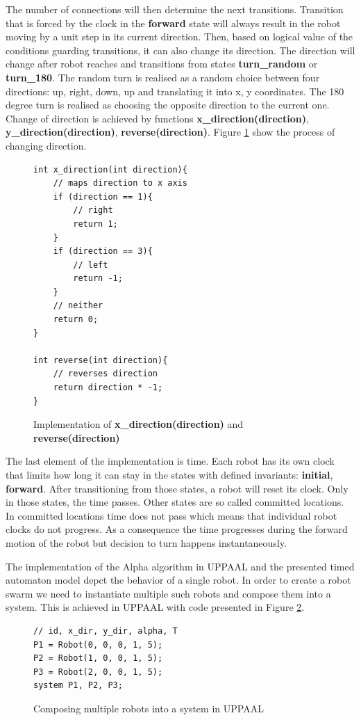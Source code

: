 The number of connections will then determine the next transitions. Transition that is forced by the clock in the \textbf{forward} state will always result in the robot moving by a unit step in its current direction. Then, based on logical value of the conditions guarding transitions, it can also change its direction. The direction will change after robot reaches and transitions from states \textbf{turn\_random} or \textbf{turn\_180}. The random turn is realised as a random choice between four directions: up, right, down, up and translating it into x, y coordinates. The 180 degree turn is realised as choosing the opposite direction to the current one. Change of direction is achieved by functions \textbf{x\_direction(direction)}, \textbf{y\_direction(direction)}, \textbf{reverse(direction)}. Figure \ref{fig:direction} show the process of changing direction.
\begin{figure}[H]
\caption{Implementation of \textbf{x\_direction(direction)} and \textbf{reverse(direction)}}
\lstset { language=C++ }
\begin{lstlisting}
int x_direction(int direction){
    // maps direction to x axis
    if (direction == 1){
        // right
        return 1;
    }
    if (direction == 3){
        // left
        return -1;
    }
    // neither
    return 0;
}

int reverse(int direction){
    // reverses direction
    return direction * -1;
}
\end{lstlisting}
\label{fig:direction}
\end{figure}

The last element of the implementation is time. Each robot has its own clock that limits how long it can stay in the states with defined invariants: \textbf{initial}, \textbf{forward}. After transitioning from those states, a robot will reset its clock. Only in those states, the time passes. Other states are so called committed locations. In committed locations time does not pass which means that individual robot clocks do not progress. As a consequence the time progresses during the forward motion of the robot but decision to turn happens instantaneously.

The implementation of the Alpha algorithm in UPPAAL and the presented timed automaton model depct the behavior of a single robot. In order to create a robot swarm we need to instantiate multiple such robots and compose them into a system. This is achieved in UPPAAL with code presented in Figure \ref{fig:composition}.
\begin{figure}[H]
\caption{Composing multiple robots into a system in UPPAAL}
\lstset { language=C++ }
\begin{lstlisting}
// id, x_dir, y_dir, alpha, T
P1 = Robot(0, 0, 0, 1, 5);
P2 = Robot(1, 0, 0, 1, 5);
P3 = Robot(2, 0, 0, 1, 5);
system P1, P2, P3;
\end{lstlisting}
\label{fig:composition}
\end{figure}



